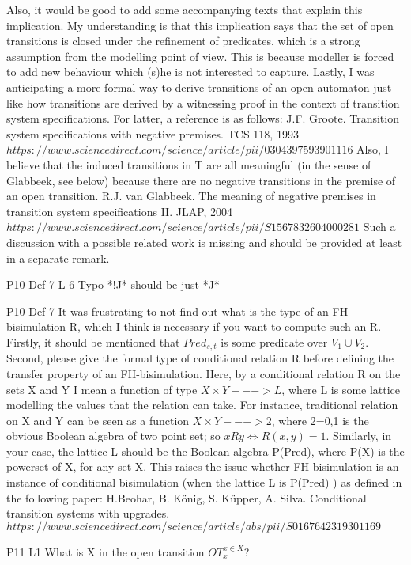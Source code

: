 \documentclass{article}
\begin{document}
Also, it would be good to add some accompanying texts that explain this implication. My understanding is that this implication says that the set of open transitions is closed under the
refinement of predicates, which is a strong assumption from the modelling point of view. This is because modeller is forced to add new behaviour which (s)he is not interested to capture.
Lastly, I was anticipating a more formal way to derive transitions of an open automaton just like how transitions are derived by a witnessing proof in the context of transition system specifications. For latter, a reference is as follows:
J.F. Groote. Transition system specifications with negative premises. TCS 118, 1993 $https://www.sciencedirect.com/science/article/pii/0304397593901116$
Also, I believe that the induced transitions in T are all meaningful (in the sense of Glabbeek, see below) because there are no negative transitions in the premise of an open transition.
R.J. van Glabbeek. The meaning of negative premises in transition system specifications II. JLAP, 2004 $https://www.sciencedirect.com/science/article/pii/S1567832604000281$
Such a discussion with a possible related work is missing and should be provided at least in a separate remark.

P10 Def 7 L-6 Typo *!J* should be just *J*

P10 Def 7 It was frustrating to not find out what is the type of an FH-bisimulation R, which I think is necessary if you want to compute such an R. Firstly, it should be mentioned that $Pred_{s,t}$ is some predicate over $V_1 \cup V_2$. Second, please give the formal type of conditional relation R before defining the transfer property of an FH-bisimulation. Here, by a conditional relation R on the sets X and Y I mean a function of type $X \times Y ---> L$, where L is some lattice modelling the values that the relation can take. For instance, traditional relation on X and Y can be seen as a function $X \times Y ---> 2$, where 2={0,1} is the obvious Boolean algebra of two point set; so $x R y \iff R(x,y)=1$. Similarly, in your case, the lattice L should be the Boolean algebra P(Pred), where P(X) is the powerset of X, for any set X.
This raises the issue whether FH-bisimulation is an instance of conditional bisimulation (when the lattice L is P(Pred) ) as defined in the following paper:
H.Beohar, B. König, S. Küpper,  A. Silva. Conditional transition systems with upgrades. $https://www.sciencedirect.com/science/article/abs/pii/S0167642319301169$

P11 L1 What is X in the open transition $OT_x^{x\in X}$?
\end{document}
